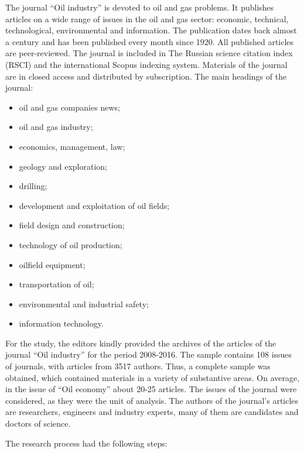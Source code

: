 \documentclass[12pt]{report}
\theoremstyle{definition}
\providecommand{\tightlist}{%
	\setlength{\itemsep}{0pt}\setlength{\parskip}{0pt}}
\begin{document}
The journal ``Oil industry'' is devoted to oil and gas problems.
It publishes articles on a wide range of issues in the oil and gas sector: economic, technical, technological, environmental and information. The publication dates back almost a century and has been published every month since 1920. 
All published articles are peer-reviewed.
The journal is included in The Russian science citation index (RSCI) and the international Scopus indexing system. 
Materials of the journal are in closed access and distributed by subscription. 
The main headings of the journal:

\begin{itemize}
	\tightlist
	\item oil and gas companies news;
	\item oil and gas industry;
	\item economics, management, law;
	\item geology and exploration;
	\item drilling;
	\item development and exploitation of oil fields;
	\item field design and construction;
	\item technology of oil production;
	\item oilfield equipment;
	\item transportation of oil;
	\item environmental and industrial safety;
	\item information technology. 
\end{itemize}

For the study, the editors kindly provided the archives of the articles of the journal ``Oil industry'' for the period 2008-2016. 
The sample contains 108 issues of journals, with articles from 3517 authors. 
Thus, a complete sample was obtained, which contained materials in a variety of substantive areas. 
On average, in the issue of ``Oil economy'' about 20-25 articles. 
The issues of the journal were considered, as they were the unit of analysis. 
The authors of the journal's articles are researchers, engineers and industry experts, many of them are candidates and doctors of science.

The research process had the following steps:
\end{document}

